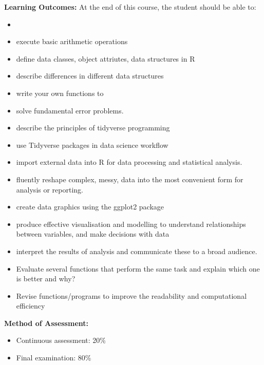 \documentclass[a4paper,12pt]{article}
\begin{document}
\newpage

\noindent\textbf{Learning Outcomes:}
At the end of this course, the student should be able to:
\begin{itemize}
	\setlength\itemsep{0.1mm}
\item 
\item execute basic arithmetic operations
\item define data classes, object attriutes, data structures in R
\item describe differences in different data structures
\item write your own functions to 
\item solve fundamental error problems.
\item describe the principles of tidyverse programming
\item use Tidyverse packages in data science workflow 
\item import external data into R for data processing and statistical analysis.
\item fluently reshape complex, messy, data into the most convenient form for analysis or reporting.
\item create data graphics using the ggplot2 package
\item produce effective visualisation and modelling to understand relationships between variables, and make decisions with data
\item interpret the results of analysis and communicate these to a broad audience.
\item Evaluate several functions that perform the same task and explain which one is better and why?
\item Revise functions/programs to improve the readability and computational efficiency

\end{itemize}

\noindent\textbf{Method of Assessment:}
\begin{itemize}
	\setlength\itemsep{0.1mm}
	\item Continuous assessment: 20\%
	\item Final examination: 80\%
\end{itemize}
\end{document}

